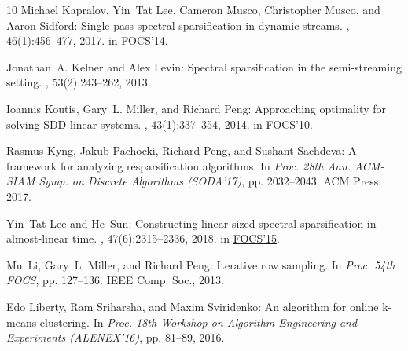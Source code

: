 \documentclass[11pt]{article}
\numberwithin{equation}{section}
\theoremstyle{definition}
\theoremstyle{plain}
\begin{document}
\begin{thebibliography}{10}
{\sc Michael Kapralov, Yin~Tat Lee, Cameron Musco, Christopher Musco, and Aaron
  Sidford}: Single pass spectral sparsification in dynamic streams.
, 46(1):456--477, 2017.
\newblock \prelim in \href{https://doi.org/10.1109/FOCS.2014.66}{FOCS'14}.

{\sc Jonathan~A. Kelner and Alex Levin}: Spectral sparsification in the
  semi-streaming setting.
, 53(2):243--262, 2013.
\newblock [\epfmtdoi{10.1007/s00224-012-9396-1}]

{\sc Ioannis Koutis, Gary~L. Miller, and Richard Peng}: Approaching optimality
  for solving {SDD} linear systems.
, 43(1):337--354, 2014.
\newblock \prelim in \href{https://doi.org/10.1109/FOCS.2010.29}{FOCS'10}.

{\sc Rasmus Kyng, Jakub Pachocki, Richard Peng, and Sushant Sachdeva}: A
  framework for analyzing resparsification algorithms.
\newblock In {\em Proc. 28th Ann. ACM-SIAM Symp. on Discrete Algorithms
  (SODA'17)}, pp. 2032--2043. ACM Press, 2017.

{\sc Yin~Tat Lee and He~Sun}: Constructing linear-sized spectral sparsification
  in almost-linear time.
, 47(6):2315--2336, 2018.
\newblock \prelim in \href{https://doi.org/10.1109/FOCS.2015.24}{FOCS'15}.

{\sc Mu~Li, Gary~L. Miller, and Richard Peng}: Iterative row sampling.
\newblock In {\em Proc. 54th FOCS}, pp. 127--136. IEEE Comp. Soc., 2013.

{\sc Edo Liberty, Ram Sriharsha, and Maxim Sviridenko}: An algorithm for online
  k-means clustering.
\newblock In {\em Proc. 18th Workshop on Algorithm Engineering and Experiments
  (ALENEX'16)}, pp. 81--89, 2016.


\end{thebibliography}
\end{document}
